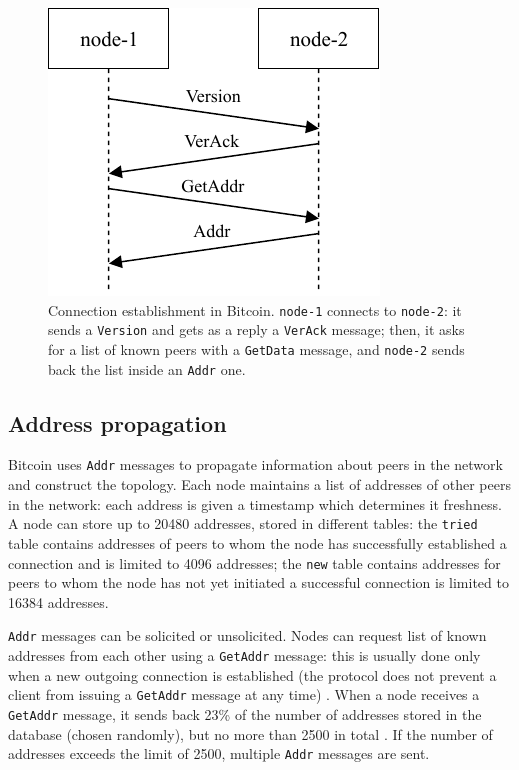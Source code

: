 \begin{figure}[ht]
	\centering
	\vspace*{0.4cm}
	\includegraphics[scale=1.04]{figures/connection}
	\vspace*{0.25cm}
	\caption[Connection establishment in Bitcoin]{
		Connection establishment in Bitcoin.
		\texttt{node-1} connects to \texttt{node-2}:
		it sends a \texttt{Version} and gets as a reply a \texttt{VerAck} message;
		then, it asks for a list of known peers with a \texttt{GetData} message, and \texttt{node-2} sends back the list inside an \texttt{Addr} one.
	}
	\label{fig:connection}
\end{figure}

\subsection{Address propagation}
\label{sub:address-propagation}
Bitcoin uses \texttt{Addr} messages to propagate information about peers in the network and construct the topology.
Each node maintains a list of addresses of other peers in the network:
each address is given a timestamp which determines it freshness.
A node can store up to \num{20480} addresses, stored in different tables:
the \texttt{tried} table contains addresses of peers to whom the node has successfully established a connection and is limited to \num{4096} addresses;
the \texttt{new} table contains addresses for peers to whom the node has not yet initiated a successful connection is limited to \num{16384} addresses.

\texttt{Addr} messages can be solicited or unsolicited.
Nodes can request list of known addresses from each other using a \texttt{GetAddr} message:
this is usually done only when a new outgoing connection is established (the protocol does not prevent a client from issuing a \texttt{GetAddr} message at any time) \cite{eclipse_attack_2015}.
When a node receives a \texttt{GetAddr} message, it sends back \num{23}\% of the number of addresses stored in the database (chosen randomly), but no more than \num{2500} in total \cite{deanonymisation_2014}.
If the number of addresses exceeds the limit of \num{2500}, multiple \texttt{Addr} messages are sent.

